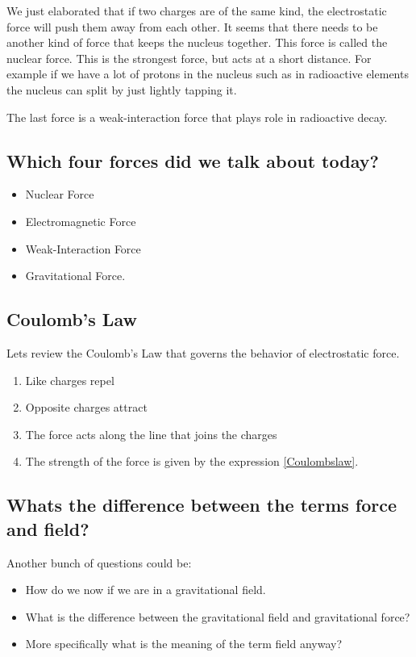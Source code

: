 \documentclass{ximera}
\begin{document}
We just elaborated that if two charges are of the same kind, the electrostatic force will push them away from each other. It seems that there needs to be another kind of force that keeps the nucleus together. This force is called the nuclear force. This is the strongest force, but acts at a short distance. For example if we have a lot of protons in the nucleus such as in radioactive elements the nucleus can split by just lightly tapping it. 

The last force is a weak-interaction force that plays role in radioactive decay. 


\subsection{Which four forces did we talk about today?}

\begin{itemize}
\item Nuclear Force
\item Electromagnetic Force
\item Weak-Interaction Force
\item Gravitational Force.
\end{itemize}

\subsection{Coulomb's Law}

Lets review the Coulomb's Law that governs the behavior of electrostatic force.

\begin{enumerate}
\item Like charges repel
\item Opposite charges attract
\item The force acts along the line that joins the charges
\item The strength of the force is given by the expression \ref{Coulombslaw}.
\end{enumerate}





\subsection{Whats the difference between the terms force and field?}

Another bunch of questions could be:
\begin{itemize}
\item How do we now if we are in a gravitational field.
\item What is the difference between the gravitational field and gravitational force?
\item More specifically what is the meaning of the term field anyway?
\end{itemize}
\end{document}
